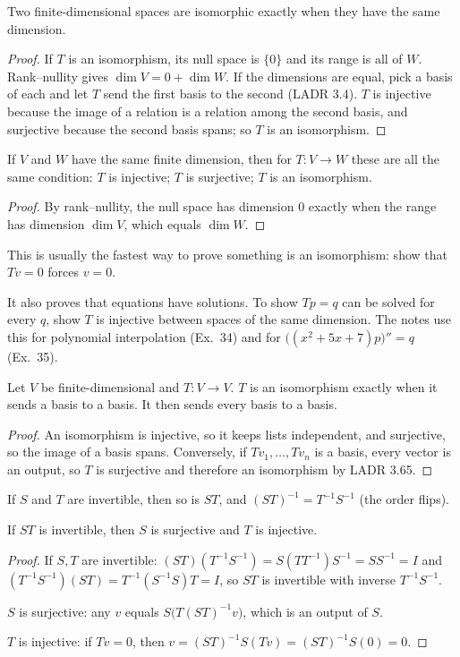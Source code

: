 \documentclass[11pt]{scrartcl}
\begin{document}
\begin{theorem*}[LADR 3.70]
  Two finite-dimensional spaces are isomorphic exactly when they have the same dimension.
\end{theorem*}
\begin{proof}
  If $T$ is an isomorphism, its null space is $\{0\}$ and its range is all of $W$. Rank--nullity gives $\dim V=0+\dim W$.
  If the dimensions are equal, pick a basis of each and let $T$ send the first basis to the second (LADR 3.4). $T$ is injective because the image of a relation is a relation among the second basis, and surjective because the second basis spans; so $T$ is an isomorphism.
\end{proof}

\begin{theorem*}[LADR 3.65]
  If $V$ and $W$ have the same finite dimension, then for $T\colon V\to W$ these are all the same condition:
  $T$ is injective; $T$ is surjective; $T$ is an isomorphism.
\end{theorem*}
\begin{proof}
  By rank--nullity, the null space has dimension $0$ exactly when the range has dimension $\dim V$, which equals $\dim W$.
\end{proof}
This is usually the fastest way to prove something is an isomorphism: show that $Tv=0$ forces $v=0$.

It also proves that equations have solutions. To show $Tp=q$ can be solved for every $q$, show $T$ is injective between spaces of the same dimension. The notes use this for polynomial interpolation (Ex.~34) and for $\big((x^2+5x+7)p\big)''=q$ (Ex.~35).

\begin{proposition*}[HW4 P3]
  Let $V$ be finite-dimensional and $T\colon V\to V$.
  $T$ is an isomorphism exactly when it sends a basis to a basis. It then sends every basis to a basis.
\end{proposition*}
\begin{proof}
  An isomorphism is injective, so it keeps lists independent, and surjective, so the image of a basis spans.
  Conversely, if $Tv_1,\dots,Tv_n$ is a basis, every vector is an output, so $T$ is surjective and therefore an isomorphism by LADR 3.65.
\end{proof}

\begin{proposition*}[LADR 3D]
  If $S$ and $T$ are invertible, then so is $ST$, and $(ST)^{-1}=T^{-1}S^{-1}$ (the order flips).

  If $ST$ is invertible, then $S$ is surjective and $T$ is injective.
\end{proposition*}
\begin{proof}
  If $S,T$ are invertible: $(ST)(T^{-1}S^{-1})=S(TT^{-1})S^{-1}=SS^{-1}=I$ and $(T^{-1}S^{-1})(ST)=T^{-1}(S^{-1}S)T=I$, so $ST$ is invertible with inverse $T^{-1}S^{-1}$.

  $S$ is surjective: any $v$ equals $S\big(T(ST)^{-1}v\big)$, which is an output of $S$.

  $T$ is injective: if $Tv=0$, then $v=(ST)^{-1}S(Tv)=(ST)^{-1}S(0)=0$.
\end{proof}
\end{document}
